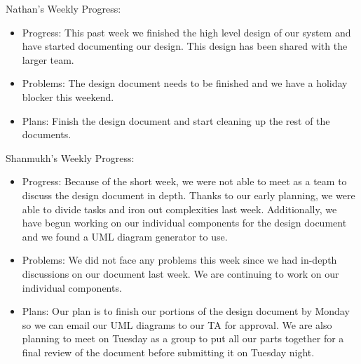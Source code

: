 \documentclass[onecolumn, oneside, letterpaper, draftclsnofoot, 10pt, compsoc]{IEEEtran}
\begin{document}
Nathan's Weekly Progress:
\begin{itemize}
    \item Progress:
    This past week we finished the high level design of our system and have started documenting our design. This design has been shared with the larger team.
    \item Problems:
    The design document needs to be finished and we have a holiday blocker this weekend.
    \item Plans:
    Finish the design document and start cleaning up the rest of the documents.
    \end{itemize}
Shanmukh's Weekly Progress:
\begin{itemize}
    \item Progress: Because of the short week, we were not able to meet as a team to discuss the design document in depth. Thanks to our early planning, we were able to divide tasks and iron out complexities last week. Additionally, we have begun working on our individual components for the design document and we found a UML diagram generator to use.
    \item Problems: We did not face any problems this week since we had in-depth discussions on our document last week. We are continuing to work on our individual components.
    \item Plans: Our plan is to finish our portions of the design document by Monday so we can email our UML diagrams to our TA for approval. We are also planning to meet on Tuesday as a group to put all our parts together for a final review of the document before submitting it on Tuesday night.
\end{itemize}


\clearpage
\medskip


\end{document}
